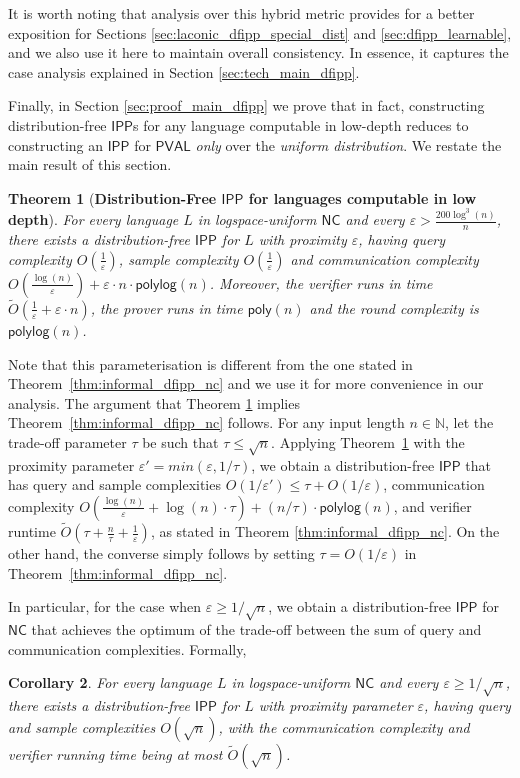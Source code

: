 \documentclass[11pt]{article}
\newtheorem{theorem}{Theorem}[section]
\newtheorem{corollary}[theorem]{Corollary}
\newcommand{\poly}{\mathsf{poly}}
\newcommand{\polylog}{\mathsf{polylog}}
\newcommand{\NC}{\mathsf{NC}}
\newcommand{\PVAL}{\mathsf{PVAL}}
\newcommand{\IPP}{\mathsf{IPP}}
\newcommand{\N}{\mathbb{N}}
\newcommand{\eps}{\varepsilon}
\begin{document}
It is worth noting that analysis over this hybrid metric provides for a better exposition for Sections \ref{sec:laconic_dfipp_special_dist} and \ref{sec:dfipp_learnable}, and we also use it here to maintain overall consistency. In essence, it captures the case analysis explained in Section \ref{sec:tech_main_dfipp}. 

Finally, in Section \ref{sec:proof_main_dfipp} we prove that in fact, constructing distribution-free $\IPP$s for any language computable in low-depth reduces to constructing an $\IPP$ for $\PVAL$ \textit{only} over the \textit{uniform distribution}. We restate the main result of this section.

\begin{theorem}[\textbf{Distribution-Free $\IPP$ for languages computable in low depth}]\label{thm:informal_dfipp_nc_restated}
    For every language $L$ in logspace-uniform $\NC$ and every $\varepsilon > \frac{200\log^{3}(n)}{n}$, there exists a distribution-free $\IPP$ for $L$ with proximity $\varepsilon$, having query complexity $O\left( \frac{1}{\varepsilon} \right)$, sample complexity $O\left( \frac{1}{\varepsilon} \right)$ and communication complexity $O\left( \frac{\log (n)}{\varepsilon}\right) + \varepsilon \cdot n\cdot \polylog(n)$. Moreover, the verifier runs in time $\tilde{O}\left( \frac{1}{\varepsilon}+\varepsilon\cdot n \right)$, the prover runs in time $\poly(n)$ and the round complexity is $\polylog(n)$.
\end{theorem}

Note that this parameterisation is different from the one stated in Theorem~\ref{thm:informal_dfipp_nc} and we use it for more convenience in our analysis. The argument that Theorem \ref{thm:informal_dfipp_nc_restated} implies Theorem~\ref{thm:informal_dfipp_nc} follows. For any input length $n \in \N$, let the trade-off parameter $\tau$ be such that $\tau \leq \sqrt{n}$. Applying Theorem~\ref{thm:informal_dfipp_nc_restated} with the proximity parameter $\eps'=min(\eps, 1/\tau)$, we obtain a distribution-free $\IPP$ that has query and sample complexities $O(1/\eps') \leq \tau+O(1/\eps)$, communication complexity $O\left( \frac{\log (n)}{\eps} +\log (n) \cdot \tau\right) + (n/\tau)\cdot \polylog(n)$, and verifier runtime $\tilde{O}\left( \tau+\frac{n}{\tau}+\frac{1}{\eps} \right)$, as stated in Theorem \ref{thm:informal_dfipp_nc}. On the other hand, the converse simply follows by setting $\tau = O(1/\eps)$ in Theorem~\ref{thm:informal_dfipp_nc}.

In particular, for the case when $\varepsilon \geq 1/\sqrt{n}$, we obtain a distribution-free $\IPP$ for $\NC$ that achieves the optimum of the trade-off between the sum of query and communication complexities. Formally,
\begin{corollary}
    \label{cor:dfipp_for_sqrt_error}
    For every language $L$ in logspace-uniform $\NC$ and every $\varepsilon \geq 1/\sqrt{n}$, there exists a distribution-free $\IPP$ for $L$ with proximity parameter $\varepsilon$, having query and sample complexities $O(\sqrt{n})$, with the communication complexity and verifier running time being at most $\tilde{O}(\sqrt{n})$.
\end{corollary}
\end{document}
